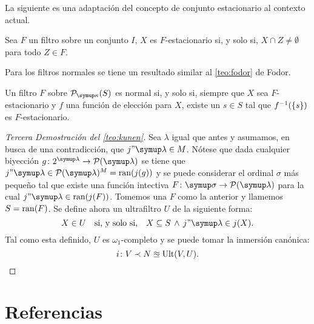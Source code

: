 La siguiente es una adaptación del concepto de conjunto estacionario al
contexto actual.

\begin{defi}
    Sea $F$ un filtro sobre un conjunto $I$, $X$ es $F$-estacionario si, y solo si,
    $X\cap Z\neq\emptyset$ para todo $Z\in F$.
\end{defi}

Para los filtros normales se tiene un resultado similar al \cref{teo:fodor} de Fodor.

\begin{teo}
    Un filtro $F$ sobre $\pwset[\kappa]{S}$ es normal si, y solo si,
    siempre que $X$ sea $F$-estacionario y $f$ una función de elección para $X$,
    existe un $s\in S$ tal que $f^{-1}(\left\{ s \right\})$ es $F$-estacionario.
\end{teo}

\begin{proof}[Tercera Demostración del \cref{teo:kunen}]
    Sea $\lambda$ igual que antes y asumamos, en busca de una contradicción, que $j"\lambda\in M$.
    Nótese que dada cualquier biyección $g\colon 2^\lambda\to\pwset{\lambda}$ se tiene que
    $j"\lambda\in\pwset{\lambda}^M = \ran(j(g))$ y se puede considerar el ordinal $\sigma$ más
    pequeño tal que existe una función intectiva $F\colon\sigma\to\pwset{\lambda}$ para la cual
    $j"\lambda\in \ran(j(F))$. Tomemos una $F$ como la anterior y llamemos $S=\operatorname{ran}(F)$.
    Se define ahora un ultrafiltro $U$ de la siguiente forma:
    \[
        X\in U\quad\text{si, y solo si,}\quad X\subseteq S \,\land\, j"\lambda\in j(X).
    \]
    Tal como esta definido, $U$ es $\omega_1$-completo y se puede tomar la inmersión canónica:
    \[
        i\colon V\prec N\approxeq\operatorname{Ult}(V, U).
    \]
\end{proof}

\fi
\backmatter
\ifreferencias
\chapter*{Referencias}
\printbibliography[heading=mybib]
\fi

